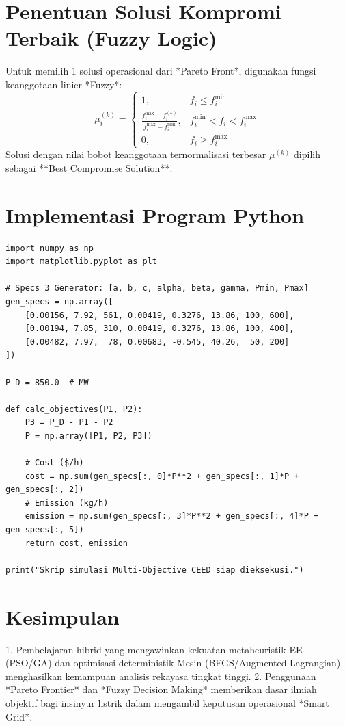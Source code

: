 \documentclass[11pt,a4paper]{article}
\begin{document}
\section{Penentuan Solusi Kompromi Terbaik (Fuzzy Logic)}
Untuk memilih 1 solusi operasional dari *Pareto Front*, digunakan fungsi keanggotaan linier *Fuzzy*:
\begin{equation}
    \mu_i^{(k)} = 
    \begin{cases}
        1, & f_i \le f_i^{\min} \\
        \frac{f_i^{\max} - f_i^{(k)}}{f_i^{\max} - f_i^{\min}}, & f_i^{\min} < f_i < f_i^{\max} \\
        0, & f_i \ge f_i^{\max}
    \end{cases}
\end{equation}
Solusi dengan nilai bobot keanggotaan ternormalisasi terbesar $\mu^{(k)}$ dipilih sebagai **Best Compromise Solution**.

\section{Implementasi Program Python}

\begin{lstlisting}[caption={Skrip Python Multi-Objective CEED dan Pareto Frontier}]
import numpy as np
import matplotlib.pyplot as plt

# Specs 3 Generator: [a, b, c, alpha, beta, gamma, Pmin, Pmax]
gen_specs = np.array([
    [0.00156, 7.92, 561, 0.00419, 0.3276, 13.86, 100, 600],
    [0.00194, 7.85, 310, 0.00419, 0.3276, 13.86, 100, 400],
    [0.00482, 7.97,  78, 0.00683, -0.545, 40.26,  50, 200]
])

P_D = 850.0  # MW

def calc_objectives(P1, P2):
    P3 = P_D - P1 - P2
    P = np.array([P1, P2, P3])
    
    # Cost ($/h)
    cost = np.sum(gen_specs[:, 0]*P**2 + gen_specs[:, 1]*P + gen_specs[:, 2])
    # Emission (kg/h)
    emission = np.sum(gen_specs[:, 3]*P**2 + gen_specs[:, 4]*P + gen_specs[:, 5])
    return cost, emission

print("Skrip simulasi Multi-Objective CEED siap dieksekusi.")
\end{lstlisting}

\section{Kesimpulan}
1. Pembelajaran hibrid yang mengawinkan kekuatan metaheuristik EE (PSO/GA) dan optimisasi deterministik Mesin (BFGS/Augmented Lagrangian) menghasilkan kemampuan analisis rekayasa tingkat tinggi.
2. Penggunaan *Pareto Frontier* dan *Fuzzy Decision Making* memberikan dasar ilmiah objektif bagi insinyur listrik dalam mengambil keputusan operasional *Smart Grid*.
\end{document}
